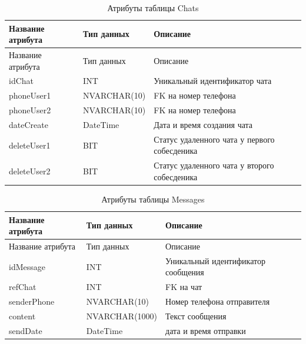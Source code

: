 \begin{xltabular}{\textwidth}{|X|X|X|}
	\caption{Атрибуты таблицы Chats\label{ssevsws:table}}\\ \hline
	\centrow Название атрибута & \centrow Тип данных & \centrow Описание \\ \hline
	\endfirsthead
	\centrow Название атрибута & \centrow Тип данных & \centrow Описание \\ \hline 
	\finishhead
	idChat & INT & Уникальный идентификатор чата \\ \hline 
	phoneUser1 & NVARCHAR(10) & FK на номер телефона \\ \hline 
	phoneUser2 & NVARCHAR(10) & FK на номер телефона \\ \hline
	dateCreate & DateTime & Дата и время создания чата \\ \hline
	deleteUser1 & BIT & Статус удаленного чата у первого собесденика \\ \hline
	deleteUser2 & BIT & Статус удаленного чата у второго собесденика \\ \hline
\end{xltabular}

\begin{xltabular}{\textwidth}{|X|X|X|}
	\caption{Атрибуты таблицы Messages\label{ssevsws:table}}\\ \hline
	\centrow Название атрибута & \centrow Тип данных & \centrow Описание \\ \hline
	\endfirsthead
	\centrow Название атрибута & \centrow Тип данных & \centrow Описание \\ \hline 
	\finishhead
	idMessage & INT & Уникальный идентификатор сообщения \\ \hline 
	refChat & INT & FK на чат \\ \hline 
	senderPhone & NVARCHAR(10) & Номер телефона отправителя \\ \hline
	content & NVARCHAR(1000) & Текст сообщения \\ \hline
	sendDate & DateTime & дата и время отправки \\ \hline
\end{xltabular}

